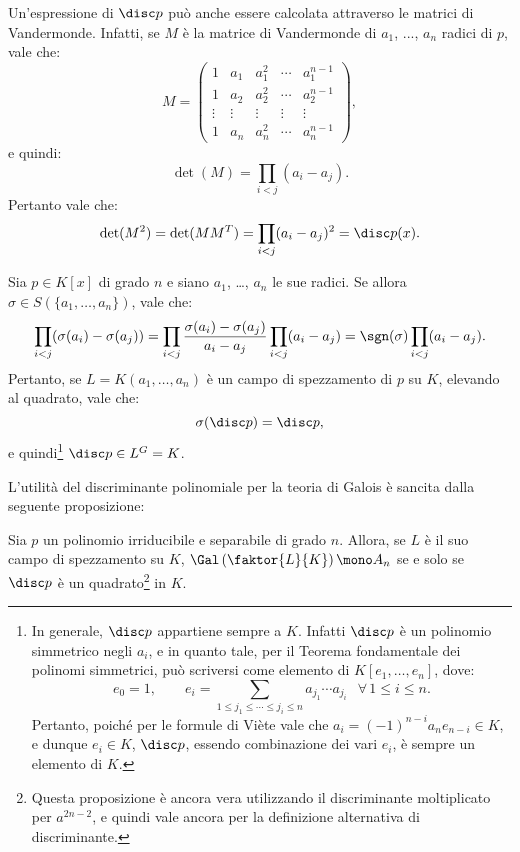 \documentclass[11pt]{scrartcl}
\begin{document}
\begin{remark}
	Un'espressione di $\disc p$ può anche essere calcolata attraverso le matrici
	di Vandermonde. Infatti, se $M$ è la matrice di Vandermonde di $a_1$, ..., $a_n$
	radici di $p$, vale che:
	\[ M = \begin{pmatrix}1 & a_1 & a_1^2 & \cdots & a_1^{n-1} \\ 1 & a_2 & a_2^2 & \cdots & a_2^{n-1} \\ \vdots & \vdots & \vdots & \vdots & \vdots \\ 1 & a_n & a_n^2 & \cdots & a_n^{n-1}\end{pmatrix}, \]
	e quindi:
	\[ \det(M) = \prod_{i < j} (a_i - a_j). \]
	Pertanto vale che:
	\[ \det(M^2) = \det(M M^T) = \prod_{i < j} (a_i - a_j)^2 = \disc p(x). \]
\end{remark}

\begin{remark}
	Sia $p \in K[x]$ di grado $n$ e siano $a_1$, \ldots, $a_n$ le sue radici.
	Se allora $\sigma \in S(\{a_1, \ldots, a_n\})$, vale che:
	\[ \prod_{i < j} (\sigma(a_i) - \sigma(a_j)) = \prod_{i < j} \frac{\sigma(a_i) - \sigma(a_j)}{a_i - a_j} \prod_{i < j} (a_i - a_j) = \sgn(\sigma) \prod_{i < j} (a_i - a_j).  \]
	Pertanto, se $L = K(a_1, \ldots, a_n)$ è un campo di spezzamento di $p$ su $K$,
	elevando al quadrato, vale che:
	\[ \sigma(\disc p) = \disc p, \]
	e quindi\footnote{
		In generale, $\disc p$ appartiene sempre a $K$. Infatti $\disc p$ è un polinomio
		simmetrico negli $a_i$, e in quanto tale, per il Teorema fondamentale dei polinomi
		simmetrici, può scriversi come elemento di $K[e_1, \ldots, e_n]$, dove:
		\[ e_0 = 1, \qquad e_i = \sum_{1 \leq j_1  \leq \cdots \leq j_i \leq n } a_{j_1} \cdots a_{j_i} \;\;\, \forall \, 1 \leq i \leq n. \]
		Pertanto, poiché per le formule di Viète vale che $a_i = (-1)^{n-i} a_n e_{n-i} \in K$, e dunque $e_i \in K$, $\disc p$, essendo combinazione dei vari $e_i$, è sempre un elemento di $K$.
	} $\disc p \in L^G = K$.
\end{remark}

L'utilità del discriminante polinomiale per la teoria di Galois è sancita dalla
seguente proposizione:

\begin{proposition}
	Sia $p$ un polinomio irriducibile e separabile di grado $n$. Allora, se $L$ è il suo
	campo di spezzamento su $K$, $\Gal\left(\faktor{L}{K}\right) \mono A_n$ se e
	solo se $\disc p$ è un quadrato\footnote{
		Questa proposizione è ancora vera utilizzando il discriminante moltiplicato
		per $a^{2n-2}$, e quindi vale ancora per la definizione alternativa di
		discriminante.
	} in $K$.
\end{proposition}
\end{document}
